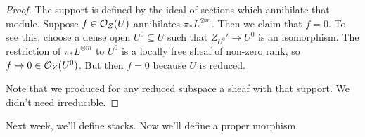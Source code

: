 \begin{proof}
   The support is defined by the ideal of sections which annihilate that module. Suppose
   $f\in \mathcal{O}_Z(U)$ annihilates $\pi_*L^{\otimes m}$. Then we claim that $f=0$. To see
   this, choose a dense open $U^0\subseteq U$ such that $Z_{U^0}'\to U^0$ is an
   isomorphism. The restriction of $\pi_*L^{\otimes m}$ to $U^0$ is a locally free sheaf
   of non-zero rank, so $f\mapsto 0\in \mathcal{O}_Z(U^0)$. But then $f=0$ because $U$ is reduced.

   Note that we produced for any reduced subspace a sheaf with that support. We
   didn't need irreducible.
 \end{proof}
 Next week, we'll define stacks. Now we'll define a proper morphism.